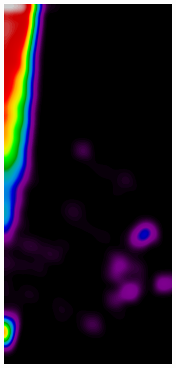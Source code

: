 \documentclass{beamer}
\begin{document}
\begin{frame}
\begin{figure}
\begin{subfigure}{0.134\textwidth}
            \end{subfigure}
            \begin{subfigure}{0.134\textwidth}
	            \centering
		            \includegraphics[width=\textwidth]{plots/examples/example1_probs_1_2.png}

\end{subfigure}
\end{figure}
\end{frame}
\end{document}
